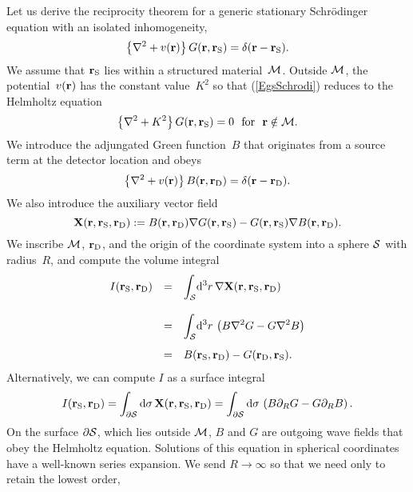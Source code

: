 Let us derive the reciprocity theorem
for a generic stationary Schrödinger equation
with an isolated inhomogeneity,
\begin{equation}\label{EgsSchrodi}
  \left\{\mathbf{\nabla}^2+v(\mathbf{r})\right\}G(\mathbf{r},\mathbf{r}_\text{S}) = \delta(\mathbf{r}-\mathbf{r}_\text{S}).
\end{equation}
We assume that $\mathbf{r}_\text{S}$ lies within a structured material~$\mathcal{M}$.
Outside $\mathcal{M}$,
the potential~$v(\mathbf{r})$ has the constant value~$K^2$
so that (\ref{EgsSchrodi})
reduces to the Helmholtz equation
\begin{equation}\label{EgsSchrodiHelmh}
  \left\{\mathbf{\nabla}^2+K^2\right\}G(\mathbf{r},\mathbf{r}_\text{S}) = 0
  \text{~~for~~}\mathbf{r}\notin\mathcal{M}.
\end{equation}
We introduce the adjungated Green function~$B$
that originates from a source term at the detector location
and obeys
\begin{equation}\label{EgsSchrodiAdj}
  \left\{\mathbf{\nabla}^2+v(\mathbf{r})\right\}B(\mathbf{r},\mathbf{r}_\text{D}) = \delta(\mathbf{r}-\mathbf{r}_\text{D}).
\end{equation}
We also introduce the auxiliary vector field
\begin{equation}
  \mathbf{X}(\mathbf{r},\mathbf{r}_\text{S},\mathbf{r}_\text{D}):=B(\mathbf{r},\mathbf{r}_\text{D})\mathbf{\nabla} G(\mathbf{r},\mathbf{r}_\text{S}) - G(\mathbf{r},\mathbf{r}_\text{S})\mathbf{\nabla} B(\mathbf{r},\mathbf{r}_\text{D}).
\end{equation}
We inscribe $\mathcal{M}$, $\mathbf{r}_\text{D}$, and the origin of the coordinate system
into a sphere $\mathcal{S}$ with radius~$R$,
and compute the volume integral
\begin{equation}\label{Eprerecipro}
  \begin{array}{lcl}
    I(\mathbf{r}_\text{S},\mathbf{r}_\text{D})
  &=& \displaystyle\int_{\mathcal{S}}\!{\rm d}^3r\,\mathbf{\nabla} \mathbf{X}(\mathbf{r},\mathbf{r}_\text{S},\mathbf{r}_\text{D})
  \\[1.8em]
  &=& \displaystyle\int_{\mathcal{S}}\!{\rm d}^3r\,\left(
    B\mathbf{\nabla}^2 G- G\mathbf{\nabla}^2 B \right)
  \\[1.4em]
  &=&  B(\mathbf{r}_\text{S},\mathbf{r}_\text{D}) - G(\mathbf{r}_\text{D},\mathbf{r}_\text{S}).
  \end{array}
\end{equation}
Alternatively, we can compute $I$ as a surface integral
\begin{equation}
  I(\mathbf{r}_\text{S},\mathbf{r}_\text{D})
  =\displaystyle\int_{\partial\mathcal{S}}{\rm d}\mathbf{\sigma}\,\mathbf{X}(\mathbf{r},\mathbf{r}_\text{S},\mathbf{r}_\text{D})
  =\displaystyle\int_{\partial\mathcal{S}}{\rm d}{\sigma}\,
       \left(B\partial_R G - G\partial_R B\right).
\end{equation}
On the surface $\partial\mathcal{S}$, which lies outside $\mathcal{M}$,
$B$ and $G$ are outgoing wave fields that obey the Helmholtz equation.
Solutions of this equation in spherical coordinates
have a well-known series expansion.
We send $R\to\infty$ so that we need only to retain the lowest order,
